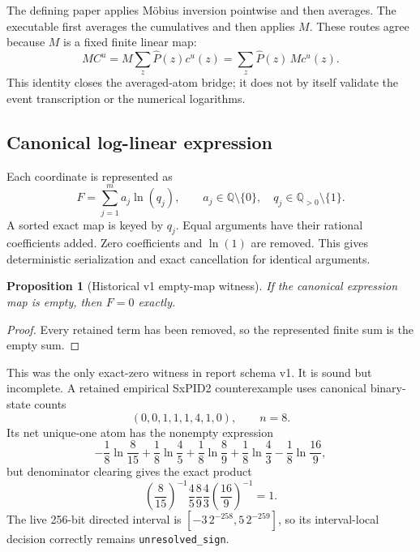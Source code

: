 \documentclass[11pt]{article}
\newtheorem{proposition}[theorem]{Proposition}
\theoremstyle{definition}
\begin{document}
The defining paper applies M{\"o}bius inversion pointwise and then averages.  The executable first
averages the cumulatives and then applies \(M\).  These routes agree because \(M\) is a fixed finite
linear map:
\[
  M C^u
  =M\sum_z\widehat P(z)c^u(z)
  =\sum_z\widehat P(z)\,M c^u(z).
\]
This identity closes the averaged-atom bridge; it does not by itself validate the event
transcription or the numerical logarithms.

\subsection{Canonical log-linear expression}

Each coordinate is represented as
\begin{equation}\label{eq:log-linear}
  F=\sum_{j=1}^{m}a_j\ln(q_j),
  \qquad
  a_j\in\mathbb{Q}\setminus\{0\},
  \quad
  q_j\in\mathbb{Q}_{>0}\setminus\{1\}.
\end{equation}
A sorted exact map is keyed by $q_j$.  Equal arguments have their rational coefficients added.
Zero coefficients and $\ln(1)$ are removed.  This gives deterministic serialization and exact
cancellation for identical arguments.

\begin{proposition}[Historical v1 empty-map witness]
If the canonical expression map is empty, then $F=0$ exactly.
\end{proposition}

\begin{proof}
Every retained term has been removed, so the represented finite sum is the empty sum.
\end{proof}

This was the only exact-zero witness in report schema v1.  It is sound but incomplete.  A retained
empirical SxPID2 counterexample uses canonical binary-state counts
\begin{equation}
  (0,0,1,1,1,4,1,0),\qquad n=8.
\end{equation}
Its net unique-one atom has the nonempty expression
\begin{equation}
 -\frac18\ln\frac8{15}+\frac18\ln\frac45+\frac18\ln\frac89
 +\frac18\ln\frac43-\frac18\ln\frac{16}{9},
\end{equation}
but denominator clearing gives the exact product
\begin{equation}
 \left(\frac8{15}\right)^{-1}\frac45\frac89\frac43
 \left(\frac{16}{9}\right)^{-1}=1.
\end{equation}
The live 256-bit directed interval is
$[-3\,2^{-258},5\,2^{-259}]$, so its interval-local decision correctly remains
\texttt{unresolved\_sign}.
\end{document}
